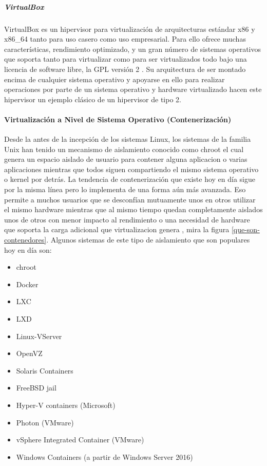 \subparagraph{VirtualBox}
VirtualBox es un hipervisor para virtualización de arquitecturas estándar x86 y x86\_64 tanto para uso casero como uso empresarial. Para ello ofrece muchas características, rendimiento optimizado, y un gran número de sistemas operativos que soporta tanto para virtualizar como para ser virtualizados todo bajo una licencia de software libre, la GPL versión 2 \citep{VirtualBox}. Su arquitectura de ser montado encima de cualquier sistema operativo y apoyarse en ello para realizar operaciones por parte de un sistema operativo y hardware virtualizado hacen este hipervisor un ejemplo clásico de un hipervisor de tipo 2.

\paragraph{Virtualización a Nivel de Sistema Operativo (Contenerización)}
Desde la antes de la incepción de los sistemas Linux, los sistemas de la familia Unix han tenido un mecanismo de aislamiento conocido como chroot el cual genera un espacio aislado de usuario para contener alguna aplicacion o varias aplicaciones mientras que todos siguen compartiendo el mismo sistema operativo o kernel por detrás. La tendencia de contenerización que existe hoy en día sigue por la misma línea pero lo implementa de una forma aún más avanzada. Eso permite a muchos usuarios que se desconfían mutuamente unos en otros utilizar el mismo hardware mientras que al mismo tiempo quedan completamente aislados unos de otros con menor impacto al rendimiento o una necesidad de hardware que soporta la carga adicional que virtualizacion genera \citep{Teimouri-Davoud-OS-level-virt}, mira la figura \ref{que-son-contenedores}. Algunos sistemas de este tipo de aislamiento que son populares hoy en día son:
\begin{itemize}
	\item chroot
    \item Docker
    \item LXC
    \item LXD
    \item Linux-VServer
    \item OpenVZ
    \item Solaris Containers
    \item FreeBSD jail
    \item Hyper-V containers (Microsoft)
    \item Photon (VMware)
    \item vSphere Integrated Container (VMware)
    \item Windows Containers (a partir de Windows Server 2016)
\end{itemize}

